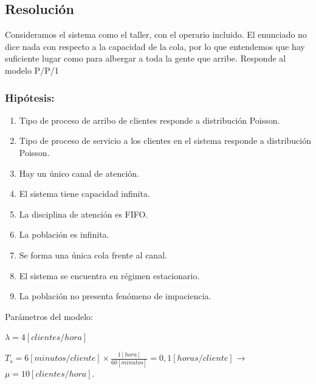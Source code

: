\documentclass[a4paper,11pt]{article}
\begin{document}
\vspace{13pt}
\leftskip=0pt
\parindent=0pt
\subsection{\textbf{Resolución}}

Consideramos el sistema como el taller, con el operario incluido. El enunciado
no dice nada con respecto a la capacidad de la cola, por lo que entendemos que
hay suficiente lugar como para albergar a toda la gente que arribe. Responde al
modelo P/P/1

\vspace{5pt}
\subsubsection*{Hipótesis:}

\begin{enumerate}[1.]
  \item Tipo de proceso de arribo de clientes responde a distribución Poisson.
  \item Tipo de proceso de servicio a los clientes en el sistema responde a
    distribución Poisson.
  \item Hay un único canal de atención.
  \item El sistema tiene capacidad infinita.
  \item La disciplina de atención es FIFO.
  \item La población es infinita.
  \item Se forma una única cola frente al canal.
  \item El sistema se encuentra en régimen estacionario.
  \item La población no presenta fenómeno de impaciencia.
\end{enumerate}

\vspace{13pt}
Parámetros del modelo:

$\lambda = 4 [clientes/hora]$

$T_s = 6 [minutos/cliente] \times \frac{1[hora]}{60[minutos]} = 0,1
[horas/cliente]$ → $\mu = 10 [clientes/hora]$.
\end{document}
